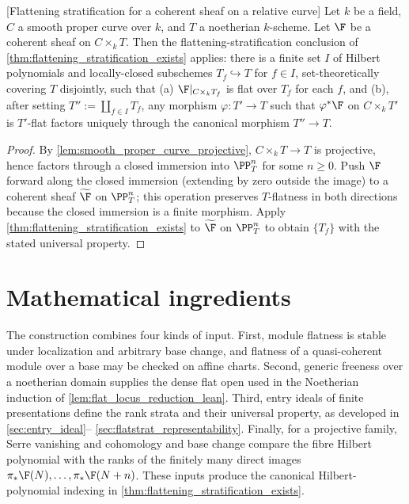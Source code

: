 \begin{corollary}

[Flattening stratification for a coherent sheaf on a relative curve]
  \label{cor:flattening_stratification_curve}
  Let \(k\) be a field, \(C\) a smooth proper curve over \(k\), and \(T\) a noetherian
  \(k\)-scheme.  Let \(\F\) be a coherent sheaf on \(C \times_k T\). Then the
  flattening-stratification conclusion of
  \cref{thm:flattening_stratification_exists} applies: there is a finite
  set \(I\) of Hilbert polynomials and locally-closed subschemes
  \(T_f \hookrightarrow T\) for \(f \in I\), set-theoretically covering \(T\)
  disjointly, such that (a) \(\F|_{C \times_k T_f}\) is flat over \(T_f\) for
  each \(f\), and (b), after setting \(T'':=\coprod_{f\in I}T_f\), any
  morphism \(\varphi : T' \to T\) such that \(\varphi^* \F\) on
  \(C \times_k T'\) is \(T'\)-flat factors uniquely through the canonical
  morphism \(T'' \to T\).
\end{corollary}

\begin{proof}
  By \cref{lem:smooth_proper_curve_projective}, \(C \times_k T \to T\) is
  projective, hence factors through a closed immersion into \(\PP^n_T\) for some
  \(n \ge 0\).  Push \(\F\) forward along the closed immersion (extending by zero
  outside the image) to a coherent sheaf \(\widetilde{\F}\) on \(\PP^n_T\); this
  operation preserves \(T\)-flatness in both directions because the closed
  immersion is a finite morphism.  Apply
  \cref{thm:flattening_stratification_exists} to \(\widetilde{\F}\) on
  \(\PP^n_T\) to obtain \(\{T_f\}\) with the stated universal property.
\end{proof}

\section{Mathematical ingredients}
\label{sec:flatstrat_mathlib_status}

The construction combines four kinds of input.  First, module flatness is
stable under localization and arbitrary base change, and flatness of a
quasi-coherent module over a base may be checked on affine charts.  Second,
generic freeness over a noetherian domain supplies the dense flat open used
in the Noetherian induction of \cref{lem:flat_locus_reduction_lean}.  Third,
entry ideals of finite presentations define the rank strata and their
universal property, as developed in \cref{sec:entry_ideal}--
\cref{sec:flatstrat_representability}.  Finally, for a projective family,
Serre vanishing and cohomology and base change compare the fibre Hilbert
polynomial with the ranks of the finitely many direct images
\(\pi_*\F(N),\ldots,\pi_*\F(N+n)\).  These inputs produce the canonical
Hilbert-polynomial indexing in
\cref{thm:flattening_stratification_exists}.

